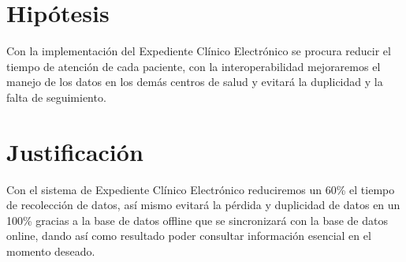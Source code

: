 \section{Hipótesis}
Con la implementación del Expediente Clínico Electrónico se procura reducir el tiempo de atención de cada paciente, con la interoperabilidad mejoraremos el manejo de los datos en los demás centros de salud y evitará la duplicidad y la falta de seguimiento.

\label{sec:hipotesis}



\section{Justificación}
\label{sec:justificacion}
Con el sistema de Expediente Clínico Electrónico reduciremos un 60\% el tiempo de recolección de datos, así mismo evitará la pérdida y duplicidad de datos en un 100\% gracias a la base de datos offline que se sincronizará con la base de datos online, dando así como resultado poder consultar información esencial en el momento deseado.
